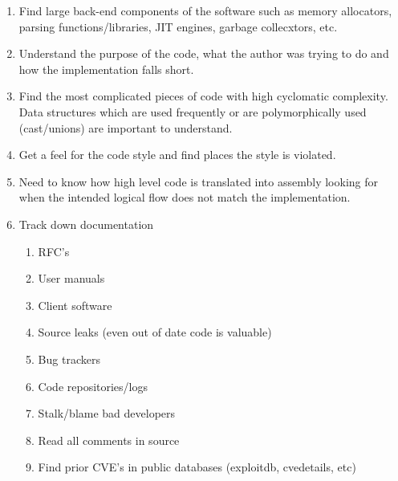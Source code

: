 \documentclass[12pt]{Training}
\begin{document}
\begin{enumerate}
\begin{enumerate}
		\item Find large back-end components of the software such as memory allocators, parsing functions/libraries, JIT engines, garbage collecxtors, etc.
		\item Understand the purpose of the code, what the author was trying to do and how the implementation falls short.
		\item Find the most complicated pieces of code with high cyclomatic complexity. Data structures which are used frequently or are polymorphically used (cast/unions) are important to understand.
		\item Get a feel for the code style and find places the style is violated.
		\item Need to know how high level code is translated into assembly looking for when the intended logical flow does not match the implementation.
		\item Track down documentation
			\begin{enumerate}
				\item RFC's
				\item User manuals
				\item Client software
				\item Source leaks (even out of date code is valuable)
				\item Bug trackers
				\item Code repositories/logs
				\item Stalk/blame bad developers
				\item Read all comments in source
				\item Find prior CVE's in public databases (exploitdb, cvedetails, etc)
			\end{enumerate}
	\end{enumerate}
\end{enumerate}
\end{document}

